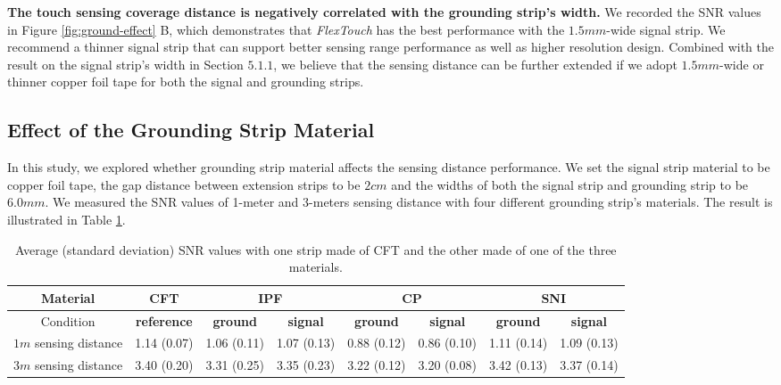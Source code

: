 \textbf{The touch sensing coverage distance is negatively correlated with the grounding strip's width.} We recorded the SNR values in Figure \ref{fig:ground-effect} B, which demonstrates that \textit{FlexTouch} has the best performance with the $1.5mm$-wide signal strip. We recommend a thinner signal strip that can support better sensing range performance as well as higher resolution design. Combined with the result on the signal strip's width in Section $5.1.1$, we believe that the sensing distance can be further extended if we adopt $1.5 mm$-wide or thinner copper foil tape for both the signal and grounding strips.

\subsection{Effect of the Grounding Strip Material}
In this study, we explored whether grounding strip material affects the sensing distance performance. We set the signal strip material to be copper foil tape, the gap distance between extension strips to be $2 cm$ and the widths of both the signal strip and grounding strip to be $6.0 mm$. We measured the SNR values of 1-meter and 3-meters sensing distance with four different grounding strip's materials. The result is illustrated in Table \ref{tab:gnd-material}.

\begin{table}[ht]
\caption{Average (standard deviation) SNR values with one strip made of CFT and the other made of one of the three materials.}
\vspace{-2mm}
\centering
	\begin{tabular}{|c|c|c|c|c|c|c|c|}
	\hline
	Material &\textbf{CFT} & \multicolumn{2}{c|}{\textbf{IPF}} & \multicolumn{2}{c|}{\textbf{CP}} & \multicolumn{2}{c|}{\textbf{SNI}} \\
	\hline
    Condition & \textbf{reference} & \textbf{ground} & \textbf{signal} & \textbf{ground} & \textbf{signal} & \textbf{ground} & \textbf{signal}  \\
	\hline
	
	$1m$ sensing distance & 1.14 (0.07) & 1.06 (0.11) & 1.07 (0.13) & 0.88 (0.12) & 0.86 (0.10) & 1.11 (0.14) & 1.09 (0.13) \\
	\hline
	$3m$ sensing distance & 3.40 (0.20) & 3.31 (0.25) & 3.35 (0.23) & 3.22 (0.12) & 3.20 (0.08) & 3.42 (0.13) & 3.37 (0.14)   \\
	\hline
	\end{tabular}
	\label{tab:gnd-material}
	
\end{table}

